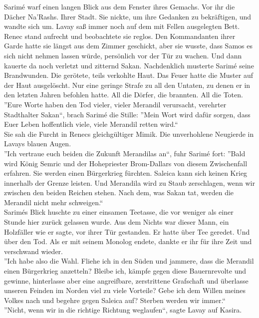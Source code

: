 Sarimé warf einen langen Blick aus dem Fenster ihres Gemachs. Vor ihr die Dächer Na'Rashs. Ihrer 
Stadt. Sie nickte, um ihre Gedanken zu bekräftigen, und wandte sich um. Lavay saß immer noch 
auf dem mit Fellen ausgelegten Bett. Renec stand aufrecht und beobachtete sie reglos. 
Den Kommandanten ihrer Garde hatte sie längst aus dem Zimmer geschickt, aber sie wusste, dass Samos 
es sich nicht nehmen lassen würde, persönlich vor der Tür zu wachen. Und dann kauerte da noch 
verletzt und zitternd Sakan. Nachdenklich musterte Sarimé seine Brandwunden. Die gerötete, teils 
verkohlte Haut. Das Feuer hatte die Muster auf der Haut ausgelöscht. Nur eine geringe Strafe zu 
all den Untaten, zu denen er in den letzten Jahren befohlen hatte. All die Dörfer, die brannten. 
All die Toten.\\
''Eure Worte haben den Tod vieler, vieler Merandil verursacht, verehrter Stadthalter Sakan``, brach 
Sarimé die Stille: ''Mein Wort wird dafür sorgen, dass Euer Leben hoffentlich viele, viele Merandil 
retten wird.``\\
Sie sah die Furcht in Renecs gleichgültiger Mimik. Die unverhohlene Neugierde in Lavays blauen 
Augen.\\
''Ich vertraue euch beiden die Zukunft Merandilas an``, fuhr Sarimé fort: ''Bald wird König Semric 
und der Hohepriester Brom-Dallars von diesem Zwischenfall erfahren. Sie werden einen Bürgerkrieg 
fürchten. Saleica kann sich keinen Krieg innerhalb der Grenze leisten. Und Merandila wird zu Staub 
zerschlagen, wenn wir zwischen den beiden Reichen stehen. Nach dem, was Sakan tat, werden die 
Merandil nicht mehr schweigen.``\\
Sarimés Blick huschte zu einer einsamen Teetasse, die vor weniger als einer Stunde hier zurück 
gelassen wurde. Aus dem Nichts war dieser Mann, ein Holzfäller wie er sagte, vor ihrer Tür 
gestanden. Er hatte über Tee geredet. Und über den Tod. Als er mit seinem Monolog endete, dankte er 
ihr für ihre Zeit und verschwand wieder.\\
''Ich habe also die Wahl. Fliehe ich in den Süden und jammere, dass die Merandil einen Bürgerkrieg 
anzetteln? Bleibe ich, kämpfe gegen diese Bauernrevolte und gewinne, hinterlasse aber eine 
angreifbare, zerstrittene Grafschaft und überlasse unseren Feinden im Norden viel zu viele 
Vorteile? Gebe ich dem Willen meines Volkes nach und begehre gegen Saleica auf? Sterben werden wir 
immer.``\\
''Nicht, wenn wir in die richtige Richtung weglaufen``, sagte Lavay auf Kasira.\\
